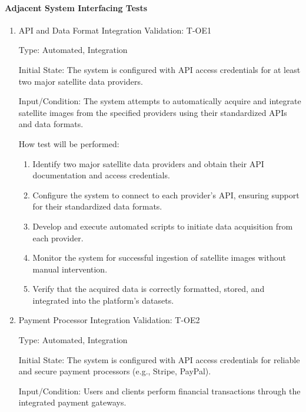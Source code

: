 \documentclass[12pt, titlepage]{article}
\begin{document}
\paragraph{Adjacent System Interfacing Tests}
\begin{enumerate}

\item{API and Data Format Integration Validation: T-OE1\\}

Type: Automated, Integration

Initial State: The system is configured with API access credentials for at least two major satellite data providers.

Input/Condition: The system attempts to automatically acquire and integrate satellite images from the specified providers using their standardized APIs and data formats.

How test will be performed:
\begin{enumerate}
    \item Identify two major satellite data providers and obtain their API documentation and access credentials.
    \item Configure the system to connect to each provider's API, ensuring support for their standardized data formats.
    \item Develop and execute automated scripts to initiate data acquisition from each provider.
    \item Monitor the system for successful ingestion of satellite images without manual intervention.
    \item Verify that the acquired data is correctly formatted, stored, and integrated into the platform's datasets.
\end{enumerate}


\item{Payment Processor Integration Validation: T-OE2\\}

Type: Automated, Integration

Initial State: The system is configured with API access credentials for reliable and secure payment processors (e.g., Stripe, PayPal).

Input/Condition: Users and clients perform financial transactions through the integrated payment gateways.


\end{enumerate}
\end{document}
